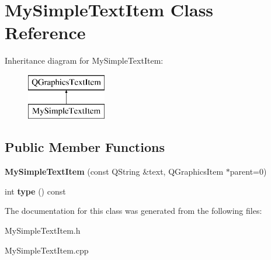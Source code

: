 \hypertarget{class_my_simple_text_item}{}\section{My\+Simple\+Text\+Item Class Reference}
\label{class_my_simple_text_item}
Inheritance diagram for My\+Simple\+Text\+Item\+:\begin{figure}[H]
\begin{center}
\leavevmode
\includegraphics[height=2.000000cm]{class_my_simple_text_item}
\end{center}
\end{figure}
\subsection*{Public Member Functions}
\begin{DoxyCompactItemize}
\item 
\hypertarget{class_my_simple_text_item_abcb188d82eae8c094d053c30f414e5f7}{}{\bfseries My\+Simple\+Text\+Item} (const Q\+String \&text, Q\+Graphics\+Item $\ast$parent=0)\label{class_my_simple_text_item_abcb188d82eae8c094d053c30f414e5f7}

\item 
\hypertarget{class_my_simple_text_item_acdb1382024e54a67c89b887b5ec67f47}{}int {\bfseries type} () const \label{class_my_simple_text_item_acdb1382024e54a67c89b887b5ec67f47}

\end{DoxyCompactItemize}


The documentation for this class was generated from the following files\+:\begin{DoxyCompactItemize}
\item 
My\+Simple\+Text\+Item.\+h\item 
My\+Simple\+Text\+Item.\+cpp\end{DoxyCompactItemize}
